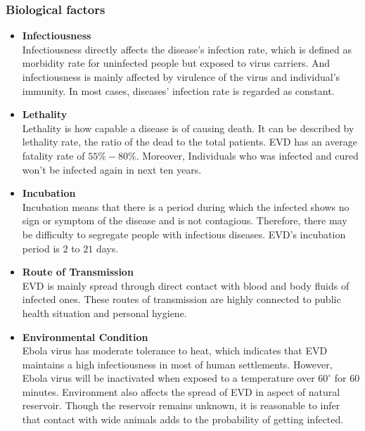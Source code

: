 \subsubsection{Biological factors}
\begin{itemize}
  \item \textbf{Infectiousness }\\ Infectiousness directly affects the disease's infection rate, which is defined as morbidity rate for uninfected people but exposed to virus carriers. And infectiousness is mainly affected by virulence of the virus and individual's immunity. In most cases, diseases' infection rate is regarded as constant.\\ 
      
  \item \textbf{Lethality }\\ Lethality is how capable a disease is of causing death. It can be described by lethality rate, the ratio of the dead to the total patients. EVD has an average fatality rate of $55\%-80\%$. Moreover, Individuals who was infected and cured won't be infected again in next ten years.
       
  \item \textbf{Incubation}\\ Incubation means that there is a period during which the infected shows no sign or symptom of the disease and is not contagious\cite{CDC}. Therefore, there may be difficulty to segregate people with infectious diseases. EVD's incubation period is $2$ to $21$ days.
      
  \item \textbf{Route of Transmission} \\EVD is mainly spread through direct contact with blood and body fluids of infected ones\cite{CDC}. These routes of transmission are highly connected to public health situation and personal hygiene.
      
  \item \textbf{Environmental Condition}\\ Ebola virus has moderate tolerance to heat, which indicates that EVD maintains a high infectiousness in most of human settlements. However, Ebola virus will be inactivated when exposed to a temperature over $60^{\circ}$  for $60$ minutes. Environment also affects the spread of EVD in aspect of natural reservoir. Though the reservoir remains unknown, it is reasonable to infer that contact with wide animals adds to the probability of getting infected.
      

\end{itemize}


